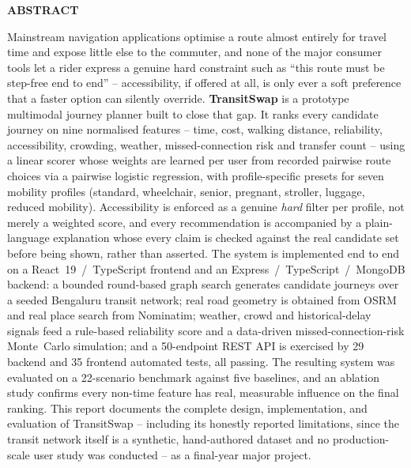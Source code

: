 \documentclass[12pt,a4paper]{report}
\begin{document}
\thispagestyle{empty}
\begin{center}
{\Large \textbf{ABSTRACT}}
\end{center}
\vspace{10pt}
\noindent
Mainstream navigation applications optimise a route almost entirely for travel time and expose
little else to the commuter, and none of the major consumer tools let a rider express a genuine
hard constraint such as ``this route must be step-free end to end'' -- accessibility, if offered at
all, is only ever a soft preference that a faster option can silently override. \textbf{TransitSwap}
is a prototype multimodal journey planner built to close that gap. It ranks every candidate journey
on nine normalised features -- time, cost, walking distance, reliability, accessibility, crowding,
weather, missed-connection risk and transfer count -- using a linear scorer whose weights are
learned per user from recorded pairwise route choices via a pairwise logistic regression, with
profile-specific presets for seven mobility profiles (standard, wheelchair, senior, pregnant,
stroller, luggage, reduced mobility). Accessibility is enforced as a genuine \emph{hard} filter per
profile, not merely a weighted score, and every recommendation is accompanied by a plain-language
explanation whose every claim is checked against the real candidate set before being shown, rather
than asserted. The system is implemented end to end on a React~19~/~TypeScript frontend and an
Express~/~TypeScript~/~MongoDB backend: a bounded round-based graph search generates candidate
journeys over a seeded Bengaluru transit network; real road geometry is obtained from OSRM and
real place search from Nominatim; weather, crowd and historical-delay signals feed a rule-based
reliability score and a data-driven missed-connection-risk Monte~Carlo simulation; and a
50-endpoint REST API is exercised by 29 backend and 35 frontend automated tests, all passing.
The resulting system was evaluated on a 22-scenario benchmark against five baselines, and an
ablation study confirms every non-time feature has real, measurable influence on the final ranking.
This report documents the complete design, implementation, and evaluation of TransitSwap --
including its honestly reported limitations, since the transit network itself is a synthetic,
hand-authored dataset and no production-scale user study was conducted -- as a final-year major
project.
\end{document}
